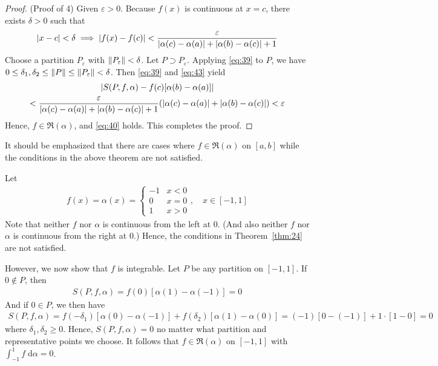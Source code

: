 \documentclass[thmcnt=section, 12pt]{my-elegantbook}
\begin{document}
\begin{proof}
    \par (Proof of 4) Given $\varepsilon > 0$. Because $f(x)$ is continuous at $x=c$, there exists $\delta > 0$ such that 
    \begin{align}
        \left\lvert x - c \right\rvert < \delta
        \implies \left\lvert f(x) - f(c) \right\rvert < \frac{\varepsilon}{\left\lvert \alpha(c) - \alpha(a) \right\rvert + \left\lvert \alpha(b) - \alpha(c) \right\rvert + 1}
        \label{eq:43}
    \end{align}
    Choose a partition $P_\varepsilon$ with $\left\lVert P_\varepsilon \right\rVert < \delta$. Let $P \supset P_\varepsilon$. Applying \eqref{eq:39} to $P$, we have $0 \leq \delta_1, \delta_2 \leq \left\lVert P \right\rVert \leq \left\lVert P_\varepsilon \right\rVert < \delta$. Then \eqref{eq:39} and \eqref{eq:43} yield 
    \begin{multline*}
        \left\lvert 
            S(P,f,\alpha)
            - f(c) [\alpha(b) - \alpha(a)]
         \right\rvert \\
        <   \frac{\varepsilon}{\left\lvert \alpha(c) - \alpha(a) \right\rvert + \left\lvert \alpha(b) - \alpha(c) \right\rvert + 1} (\left\lvert \alpha(c) - \alpha(a) \right\rvert
        + \left\lvert \alpha(b) - \alpha(c) \right\rvert)
        < \varepsilon
    \end{multline*}
    Hence, $f \in \mathfrak{R}(\alpha)$, and \eqref{eq:40} holds. This completes the proof.
\end{proof}

It should be emphasized that there are cases where $f \in \mathfrak{R}(\alpha)$ on $[a, b]$ while the conditions in the above theorem are not satisfied.

\begin{example}
    Let 
    \begin{align*}
        f(x) = \alpha(x) = \begin{cases}
            -1 &x < 0 \\ 
            0 &x=0 \\ 
            1 &x > 0
        \end{cases}, 
        \quad x \in [-1, 1]
    \end{align*}
    Note that neither $f$ nor $\alpha$ is continuous from the left at $0$. (And also neither $f$ nor $\alpha$ is continuous from the right at $0$.) Hence, the conditions in Theorem~\ref{thm:24} are not satisfied.
    
    However, we now show that $f$ is integrable. Let $P$ be any partition on $[-1, 1]$. If $0 \notin P$, then 
    \begin{align*}
        S(P,f,\alpha) = f(0)[\alpha(1) - \alpha(-1)] = 0
    \end{align*}
    And if $0 \in P$, we then have
    \begin{align*}
        S(P,f,\alpha) = f(-\delta_1)[\alpha(0) - \alpha(-1)] + f(\delta_2)[\alpha(1) - \alpha(0)]
        = (-1)[0-(-1)] + 1 \cdot [1 - 0]
        = 0
    \end{align*}
    where $\delta_1, \delta_2 \geq 0$. Hence, $S(P,f,\alpha) = 0$ no matter what partition and representative points we choose. It follows that $f \in \mathfrak{R}(\alpha)$ on $[-1, 1]$ with $\int_{-1}^{1} f \; \mathrm{d}\alpha = 0$.
\end{example}
\end{document}
